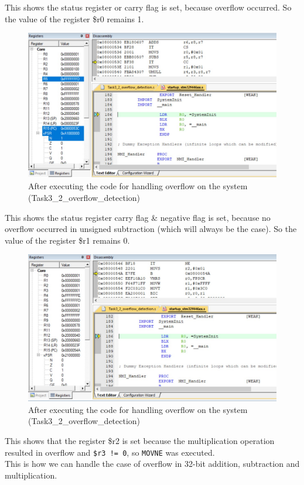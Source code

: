 \documentclass[footheight=20pt, footsepline, headheight=20pt, headsepline]{scrartcl}
\begin{document}
\FloatBarrier
This shows the status register or carry flag is set, because overflow occurred. So the value of the register \$r0 remains 1.
\begin{figure}[h!]
    \centering
    \includegraphics[scale=.7]{images/Task3_2After2.jpg}
    \caption{After executing the code for handling overflow on the system (Task3\_2\_overflow\_detection)}
    \label{fig:after_task_three_two_two}
\end{figure}
\FloatBarrier
This shows the status register carry flag \& negative flag is set, because no overflow occurred in unsigned subtraction (which will always be the case). So the value of the register \$r1 remains 0.
\begin{figure}[ht]
    \centering
    \includegraphics[scale=.7]{images/Task3_2After3.jpg}
    \caption{After executing the code for handling overflow on the system (Task3\_2\_overflow\_detection)}
    \label{fig:after_task_three_two_three}
\end{figure}
\FloatBarrier
This shows that the register \$r2 is set because the multiplication operation resulted in overflow and \verb|$r3 != 0|, so \verb|MOVNE| was executed.\\
This is how we can handle the case of overflow in 32-bit addition, subtraction and multiplication.
\end{document}
